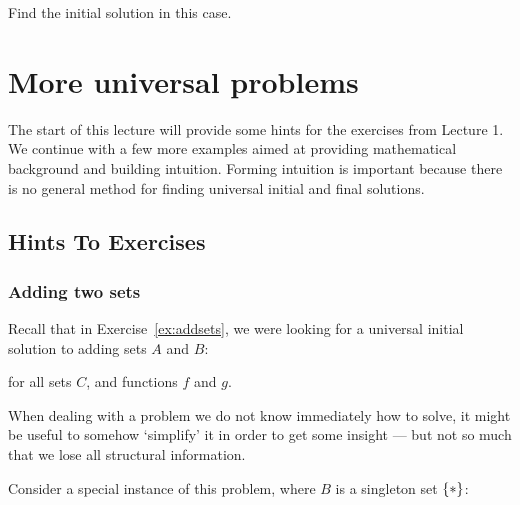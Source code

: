     \begin{exercise}
        Find the initial solution in this case.
    \end{exercise}
    
    
    \chapter{More universal problems}
    
    The start of this lecture will provide some hints for the exercises from
    Lecture 1.  We continue with a few more examples aimed at providing
    mathematical background and building intuition.  Forming intuition is
    important because there is no general method for finding universal initial and
    final solutions.
    
    \section{Hints To Exercises}
    
    \subsection{Adding two sets}
    
    Recall that in Exercise~\ref{ex:addsets}, we were looking for a universal
    initial solution to adding sets $A$ and $B$:
    \begin{center}
    \end{center}
    for all sets $C$, and functions $f$ and $g$.
    
    When dealing with a problem we do not know immediately how to solve, it might be
    useful to somehow `simplify' it in order to get some insight --- but not so much
    that we lose all structural information.
    
    Consider a special instance of this problem, where $B$ is a singleton set
    $\{ \ast \}$:
    
